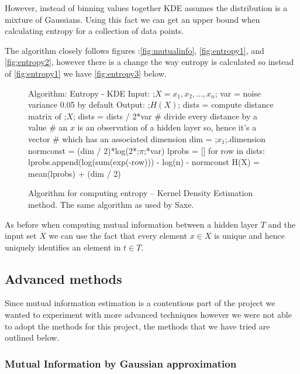 \documentclass[dissertation.tex]{subfiles}
\begin{document}
  However, instead of binning values together KDE assumes the distribution is a
  mixture of Gaussians. Using this fact we can get an upper bound when
  calculating entropy for a collection of data points.

  The algorithm closely follows figures :\autoref{fig:mutualinfo},
  \autoref{fig:entropy1}, and \autoref{fig:entropy2}, however there is a change
  the way entropy is calculated so instead of \autoref{fig:entropy1} we have
  \autoref{fig:entropy3} below.

\begin{figure}[H]
    \begin{pythonfigure}
      Algorithm: Entropy - KDE
      Input: 
      ;$X = x_1, x_2,...,x_n$;  
      var = noise variance 0.05 by default
      Output: ;$H(X)$;
      dists = compute distance matrix of ;$X$;
      dists = dists / 2*var # divide every distance by a value
      # an $x$ is an observation of a hidden layer so, hence it's a vector 
      # which has an associated dimension
      dim = ;$x_1$;.dimension
      normconst = (dim / 2)*log(2*;$\pi$;*var)
      lprobs = []
      for row in dists:
        lprobs.append(log(sum(exp(-row))) - log(n) - normconst
      H(X) = mean(lprobs) + (dim / 2)
    \end{pythonfigure}
    \caption{Algorithm for computing entropy -- Kernel Density Estimation method.
    The same algorithm as used by Saxe.}
    \label{fig:entropy3}
\end{figure} 

As before when computing mutual information between a hidden layer $T$ and the
input set $X$ we can use the fact that every element $x\in X$ is unique and
hence uniquely identifies an element in $t\in T$.

\subsection{Advanced methods} \label{ssection:advanced}

Since mutual information estimation is a contentious part of the project we
wanted to experiment with more advanced techniques however we were not able to
adopt the methods for this project, the methods that we have tried are outlined
below.

\subsubsection{Mutual Information by Gaussian approximation}
  
\end{document}
